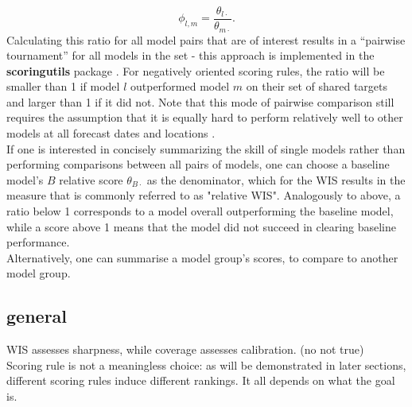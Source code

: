 \[
\phi_{l,m} = \frac{\theta_{l\cdot}}{\theta_{m\cdot}}.
\]
Calculating this ratio for all model pairs that are of interest results in a ``pairwise tournament'' for all models in the set - this approach is implemented in the \textbf{scoringutils} package \citep{bosse_epiforecastsscoringutils_2022}. For negatively oriented scoring rules, the ratio will be smaller than 1 if model $l$ outperformed model $m$ on their set of shared targets and larger than 1 if it did not. Note that this mode of pairwise comparison still requires the assumption that it is equally hard to perform relatively well to other models at all forecast dates and locations \citep{cramer_evaluation_2022}.\\
If one is interested in concisely summarizing the skill of single models rather than performing comparisons between all pairs of models, one can choose a baseline model's $B$ relative score $\theta_{B\cdot}$ as the denominator, which for the WIS results in the measure that is commonly referred to as "relative WIS". Analogously to above, a ratio below 1 corresponds to a model overall outperforming the baseline model, while a score above 1 means that the model did not succeed in clearing baseline performance.\\
Alternatively, one can summarise a model group's scores, to compare to another model group.
\subsection{general}
WIS assesses sharpness, while coverage assesses calibration. (no not true)\\
Scoring rule is not a meaningless choice: as will be demonstrated in later sections, different scoring rules induce different rankings. It all depends on what the goal is.
